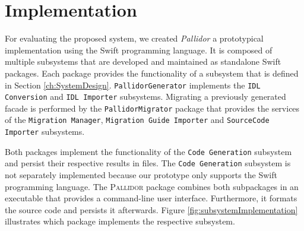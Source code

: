 \section{Implementation}
\label{sec:Implementation}

For evaluating the proposed system, we created \textit{Pallidor} a prototypical implementation using the Swift programming language. It is composed of multiple subsystems that are developed and maintained as standalone Swift packages. Each package provides the functionality of a subsystem that is defined in Section \ref{ch:SystemDesign}. \texttt{PallidorGenerator} implements the \texttt{IDL Conversion} and \texttt{IDL Importer} subsystems. Migrating a previously generated facade is performed by the \texttt{Pal\-lidor\-Migrator} package that provides the services of the \texttt{Migration Ma\-na\-ger}, \texttt{Migration Guide Importer} and \texttt{SourceCode Importer} subsystems. 

\begin{figure}[!h]
\end{figure}
Both packages implement the functionality of the \texttt{Code Generation} subsystem and persist their respective results in files. The \texttt{Code Generation} subsystem is not separately implemented because our prototype only supports the Swift programming language. The \textsc{Pallidor} package combines both subpackages in an executable that provides a command-line user interface. Furthermore, it formats the source code and persists it afterwards. Figure \ref{fig:subsystemImplementation} illustrates which package implements the respective subsystem.  

